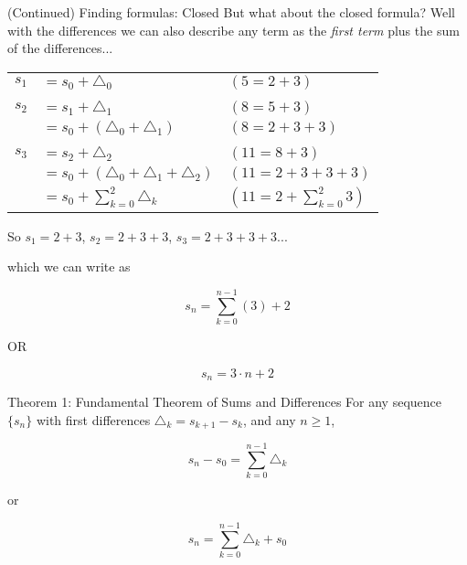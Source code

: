     \begin{intro}{(Continued) Finding formulas: Closed}
        But what about the closed formula? Well with the differences
        we can also describe any term as the \textit{first term} plus
        the sum of the differences...
        
        \begin{center}
            \begin{tabular}{c l | l}
                $s_{1}$ &   $= s_{0} + \triangle_{0}$                       & $(5 = 2 + 3)$
                \\ \\
                $s_{2}$ &   $= s_{1} + \triangle_{1}$                       & $(8 = 5 + 3)$
                \\
                &           $= s_{0} + (\triangle_{0} + \triangle_{1})$     & $(8 = 2 + 3 + 3)$
                \\ \\
                $s_{3}$ &   $= s_{2} + \triangle_{2}$                       & $(11 = 8 + 3)$
                \\
                &           $= s_{0} + (\triangle_{0} + \triangle_{1} + \triangle_{2})$ & $(11 = 2 + 3 + 3 + 3)$
                \\
                &           $= s_{0} + \sum_{k=0}^{2}{ \triangle_{k} }$     & $(11 = 2 + \sum_{k=0}^{2}{3})$
            \end{tabular}
        \end{center}

        So $s_{1} = 2 + 3$, \tab $s_{2} = 2 + 3 + 3$, \tab $s_{3} = 2 + 3 + 3 + 3$...
        
        which we can write as

        $$ s_{n} = \sum_{k=0}^{n-1}{ (3) } + 2$$
        \begin{center}
            OR
        \end{center}
        $$ s_{n} = 3 \cdot n + 2 $$
    \end{intro}


    \begin{intro}{Theorem 1: Fundamental Theorem of Sums and Differences}
        For any sequence $\{s_{n}\}$ with first differences $\triangle_{k} = s_{k+1} - s_{k}$,
        and any $n \geq 1$,

        $$s_{n} - s_{0} = \sum_{k=0}^{n-1}{ \triangle_{k} } $$

            or
        
        $$s_{n} = \sum_{k=0}^{n-1}{ \triangle_{k} } + s_{0} $$
    \end{intro}


